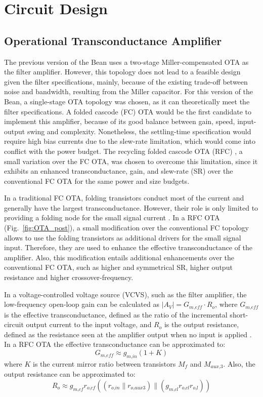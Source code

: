 \section{Circuit Design}
\subsection{Operational Transconductance Amplifier}
The previous version of the Bean uses a two-stage Miller-compensated OTA as the filter amplifier. However, this topology does not lead to a feasible design given the filter specifications, mainly, because of the existing trade-off between noise and bandwidth, resulting from the Miller capacitor. For this version of the Bean, a \mbox{single-stage} OTA topology was chosen, as it can theoretically meet the filter specifications.  A folded cascode (FC) OTA would be the first candidate to implement this amplifier, because of its good balance between gain, speed, input-output swing and complexity. Nonetheless, the settling-time specification would require high bias currents due to the slew-rate limitation, which would come into conflict with the power budget. The recycling folded cascode OTA (RFC) \citep{assaad101}, a small variation over the FC OTA, was chosen to overcome this limitation, since it exhibits an enhanced transconductance, gain, and slew-rate (SR) over the conventional FC OTA for the same power and size budgets.

In a traditional FC OTA, folding transistors conduct most of the current and generally have the largest transconductance. However, their role is only limited to providing a folding node for the small signal current \citep{assaad101}. In a RFC OTA (Fig.~\ref{fig:OTA_post}), a small modification over the conventional FC topology allows to use the folding transistors as additional drivers for the small signal input. Therefore, they are used to enhance the effective transconductance of the amplifier. Also, this modification entails additional enhancements over the conventional FC OTA, such as higher and symmetrical SR, higher output resistance and higher \mbox{crossover-frequency}.

In a voltage-controlled voltage source (VCVS), such as the filter amplifier, the low-frequency \mbox{open-loop} gain can be calculated as $|A_V| = G_\textit{m,eff}  \cdot R_\textit{o}$, where $G_\textit{m,eff}$ is the effective transconductance, defined as the ratio of the incremental short-circuit output current to the input voltage, and $R_o$ is the output resistance, defined as the resistance seen at the amplifier output when no input is applied \citep{rashid101}. In a RFC OTA the effective transconductance can be approximated to:
\begin{equation}
G_\textit{m,eff} \approx g_\textit{m,in}(1+K)\label{eq:gmeff}
\end{equation}
where $K$ is the current mirror ratio between transistors $M_f$ and $M_\textit{aux,3}$. Also, the output resistance can be approximated to:
\begin{equation}
R_\textit{o} \approx g_\textit{m,cf}r_\textit{o,cf}\left(\left(r_\textit{o,in}\parallel r_\textit{o,aux3} \right) \parallel \left(g_\textit{m,cl} r_\textit{o,cl} r_\textit{o,l}\right)\right)
\end{equation}

